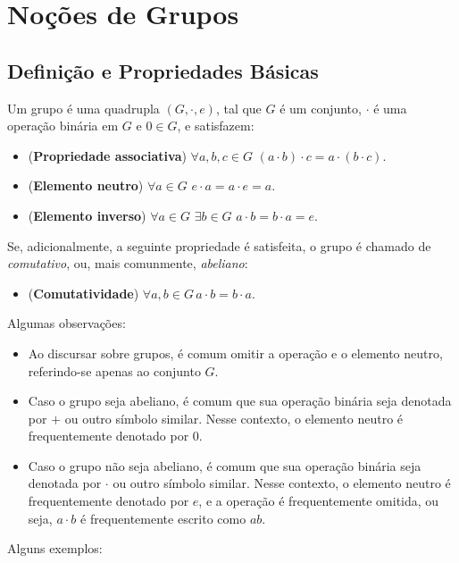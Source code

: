 \chapter{Noções de Grupos}


\section{Definição e Propriedades Básicas}
\begin{definition}
Um grupo é uma quadrupla $(G,\cdot,e)$, tal que $G$ é um conjunto, $\cdot$ é uma operação binária em $G$ e $0 \in G$, e satisfazem:

\begin{itemize}
    \item (\textbf{Propriedade associativa}) $\forall a, b, c \in G$ $(a \cdot b) \cdot c = a \cdot (b \cdot c)$.
    \item (\textbf{Elemento neutro}) $\forall a \in G$  $e \cdot a = a \cdot e = a$.
    \item (\textbf{Elemento inverso}) $\forall a \in G$ $\exists b \in G$ $a \cdot b = b \cdot a = e$.
\end{itemize}
Se, adicionalmente, a seguinte propriedade é satisfeita, o grupo é chamado de \emph{comutativo}, ou, mais comunmente, \emph{abeliano}:
\begin{itemize}
    \item (\textbf{Comutatividade}) $\forall a, b \in G\, a \cdot b = b \cdot a$.
\end{itemize}
\end{definition}
Algumas observações:
\begin{itemize}
\item Ao discursar sobre grupos, é comum omitir a operação e o elemento neutro, referindo-se apenas ao conjunto $G$.
\item Caso o grupo seja abeliano, é comum que sua operação binária seja denotada por $+$ ou outro símbolo similar. Nesse contexto, o elemento neutro é frequentemente denotado por $0$.
\item Caso o grupo não seja abeliano, é comum que sua operação binária seja denotada por $\cdot$ ou outro símbolo similar. Nesse contexto, o elemento neutro é frequentemente denotado por $e$, e a operação é frequentemente omitida, ou seja, $a \cdot b$ é frequentemente escrito como $ab$.
\end{itemize}

Alguns exemplos:

